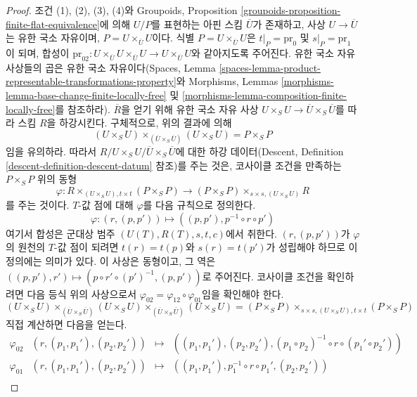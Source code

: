 \begin{proof}
조건 (1), (2), (3), (4)와 Groupoids, Proposition
\ref{groupoids-proposition-finite-flat-equivalence}에 의해 $U/P$를
표현하는 아핀 스킴 $\overline{U}$가 존재하고, 사상
$U \to \overline{U}$는 유한 국소 자유이며,
$P = U \times_{\overline{U}} U$이다. 식별
$P = U \times_{\overline{U}} U$은
$t|_P = \text{pr}_0$ 및 $s|_P = \text{pr}_1$이 되며, 합성이
$\text{pr}_{02} : U \times_{\overline{U}} U \times_{\overline{U}} U
\to U \times_{\overline{U}} U$와 같아지도록 주어진다. 유한 국소 자유
사상들의 곱은 유한 국소
자유이다(Spaces, Lemma
\ref{spaces-lemma-product-representable-transformations-property}와
Morphisms, Lemmas \ref{morphisms-lemma-base-change-finite-locally-free} 및
\ref{morphisms-lemma-composition-finite-locally-free}를 참조하라).
$\overline{R}$을 얻기 위해 유한 국소 자유 사상
$U \times_S U \to \overline{U} \times_S \overline{U}$를 따라 스킴 $R$을
하강시킨다. 구체적으로, 위의 결과에 의해
$$
(U \times_S U)
\times_{(\overline{U} \times_S \overline{U})}
(U \times_S U)
=
P \times_S P
$$
임을 유의하라. 따라서
$R / U \times_S U / \overline{U} \times_S \overline{U}$에 대한 하강
데이터(Descent, Definition \ref{descent-definition-descent-datum} 참조)를
주는 것은, 코사이클 조건을 만족하는 $P \times_S P$ 위의 동형
$$
\varphi :
R \times_{(U \times_S U), t \times t} (P \times_S P)
\longrightarrow
(P \times_S P) \times_{s \times s, (U \times_S U)} R
$$
를 주는 것이다. $T$-값 점에 대해 $\varphi$를 다음 규칙으로 정의한다.
$$
\varphi : (r, (p, p')) \longmapsto ((p, p'), p^{-1} \circ r \circ p')
$$
여기서 합성은 군대상 범주 $(U(T), R(T), s, t, c)$에서 취한다.
$(r, (p, p'))$가 $\varphi$의 원천의 $T$-값 점이 되려면
$t(r) = t(p)$와 $s(r) = t(p')$가 성립해야 하므로 이 정의에는 의미가
있다. 이 사상은 동형이고, 그 역은
$((p, p'), r') \mapsto (p \circ r' \circ (p')^{-1}, (p, p'))$로 주어진다.
코사이클 조건을 확인하려면 다음 등식 위의 사상으로서
$\varphi_{02} = \varphi_{12} \circ \varphi_{01}$임을 확인해야 한다.
$$
(U \times_S U)
\times_{(\overline{U} \times_S \overline{U})} (U \times_S U)
\times_{(\overline{U} \times_S \overline{U})} (U \times_S U) =
(P \times_S P) \times_{s \times s, (U \times_S U), t \times t} (P \times_S P)
$$
직접 계산하면 다음을 얻는다.
$$
\begin{matrix}
\varphi_{02} & (r, (p_1, p_1'), (p_2, p_2')) & \mapsto &
((p_1, p_1'), (p_2, p_2'),
(p_1 \circ p_2)^{-1} \circ r \circ (p_1' \circ p_2')) \\
\varphi_{01} & (r, (p_1, p_1'), (p_2, p_2')) & \mapsto &
((p_1, p_1'), p_1^{-1} \circ r \circ p_1', (p_2, p_2')) \\

\end{matrix}$$
\end{proof}
